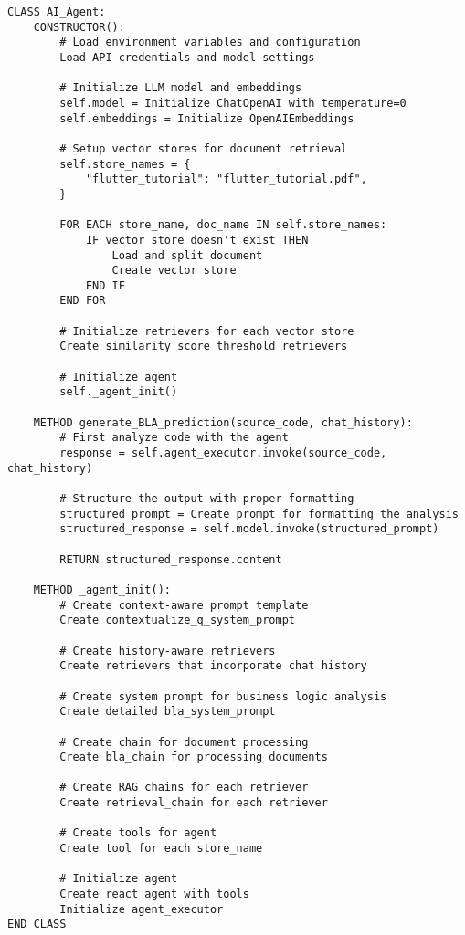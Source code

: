 \begin{lstlisting}[language=pseudocode, caption={$\texttt{AI\_Agent}$ class (Pseudocode).}, label={lst:12}]
CLASS AI_Agent:
    CONSTRUCTOR():
        # Load environment variables and configuration
        Load API credentials and model settings
        
        # Initialize LLM model and embeddings
        self.model = Initialize ChatOpenAI with temperature=0
        self.embeddings = Initialize OpenAIEmbeddings
        
        # Setup vector stores for document retrieval
        self.store_names = {
            "flutter_tutorial": "flutter_tutorial.pdf",
        }
        
        FOR EACH store_name, doc_name IN self.store_names:
            IF vector store doesn't exist THEN
                Load and split document
                Create vector store
            END IF
        END FOR
        
        # Initialize retrievers for each vector store
        Create similarity_score_threshold retrievers
        
        # Initialize agent
        self._agent_init()
    
    METHOD generate_BLA_prediction(source_code, chat_history):
        # First analyze code with the agent
        response = self.agent_executor.invoke(source_code, chat_history)
        
        # Structure the output with proper formatting
        structured_prompt = Create prompt for formatting the analysis
        structured_response = self.model.invoke(structured_prompt)
        
        RETURN structured_response.content
    
    METHOD _agent_init():
        # Create context-aware prompt template
        Create contextualize_q_system_prompt
        
        # Create history-aware retrievers
        Create retrievers that incorporate chat history
        
        # Create system prompt for business logic analysis
        Create detailed bla_system_prompt
        
        # Create chain for document processing
        Create bla_chain for processing documents
        
        # Create RAG chains for each retriever
        Create retrieval_chain for each retriever
        
        # Create tools for agent
        Create tool for each store_name
        
        # Initialize agent
        Create react agent with tools
        Initialize agent_executor
END CLASS
\end{lstlisting}


